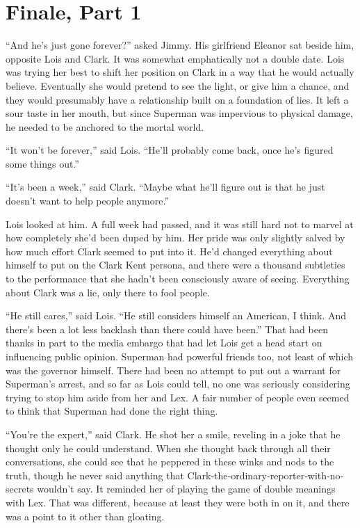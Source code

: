 \hypertarget{finale-part-1}{%
\chapter{Finale, Part 1}\label{finale-part-1}}

``And he's just gone forever?'' asked Jimmy. His girlfriend Eleanor sat
beside him, opposite Lois and Clark. It was somewhat emphatically not a
double date. Lois was trying her best to shift her position on Clark in
a way that he would actually believe. Eventually she would pretend to
see the light, or give him a chance, and they would presumably have a
relationship built on a foundation of lies. It left a sour taste in her
mouth, but since Superman was impervious to physical damage, he needed
to be anchored to the mortal world.

``It won't be forever,'' said Lois. ``He'll probably come back, once
he's figured some things out.''

``It's been a week,'' said Clark. ``Maybe what he'll figure out is that
he just doesn't want to help people anymore.''

Lois looked at him. A full week had passed, and it was still hard not to
marvel at how completely she'd been duped by him. Her pride was only
slightly salved by how much effort Clark seemed to put into it. He'd
changed everything about himself to put on the Clark Kent persona, and
there were a thousand subtleties to the performance that she hadn't been
consciously aware of seeing. Everything about Clark was a lie, only
there to fool people.

``He still cares,'' said Lois. ``He still considers himself an American,
I think. And there's been a lot less backlash than there could have
been.'' That had been thanks in part to the media embargo that had let
Lois get a head start on influencing public opinion. Superman had
powerful friends too, not least of which was the governor himself. There
had been no attempt to put out a warrant for Superman's arrest, and so
far as Lois could tell, no one was seriously considering trying to stop
him aside from her and Lex. A fair number of people even seemed to think
that Superman had done the right thing.

``You're the expert,'' said Clark. He shot her a smile, reveling in a
joke that he thought only he could understand. When she thought back
through all their conversations, she could see that he peppered in these
winks and nods to the truth, though he never said anything that
Clark‐the‐ordinary‐reporter‐with‐no‐secrets wouldn't say. It reminded
her of playing the game of double meanings with Lex. That was different,
because at least they were both in on it, and there was a point to it
other than gloating.

